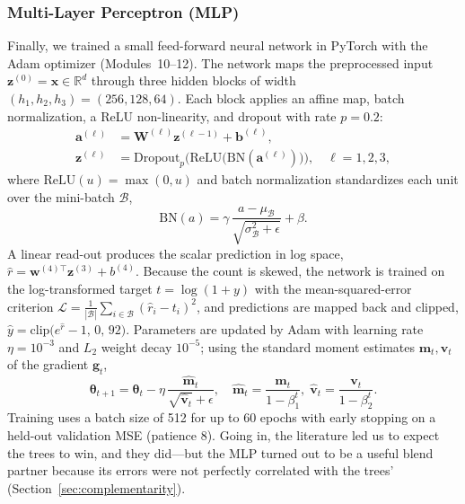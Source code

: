 \documentclass[journal]{IEEEtran}
\begin{document}
\subsubsection{Multi-Layer Perceptron (MLP)}
\label{sec:mlp}
Finally, we trained a small feed-forward neural network in PyTorch
\cite{paszke2019pytorch} with the Adam optimizer \cite{kingma2015adam}
(Modules~10--12). The network maps the preprocessed input
$\mathbf{z}^{(0)}=\mathbf{x}\in\mathbb{R}^{d}$ through three hidden blocks of
width $(h_1,h_2,h_3)=(256,128,64)$. Each block applies an affine map, batch
normalization, a ReLU non-linearity, and dropout with rate $p=0.2$:
\begin{align}
\mathbf{a}^{(\ell)} &= \mathbf{W}^{(\ell)}\mathbf{z}^{(\ell-1)}+\mathbf{b}^{(\ell)},
\label{eq:mlp_aff}\\
\mathbf{z}^{(\ell)} &= \mathrm{Dropout}_{p}\!\Big(\mathrm{ReLU}\big(
\mathrm{BN}(\mathbf{a}^{(\ell)})\big)\Big),\quad \ell=1,2,3,
\label{eq:mlp_block}
\end{align}
where $\mathrm{ReLU}(u)=\max(0,u)$ and batch normalization standardizes each
unit over the mini-batch $\mathcal{B}$,
\begin{equation}
\mathrm{BN}(a)=\gamma\,\frac{a-\mu_{\mathcal{B}}}{\sqrt{\sigma_{\mathcal{B}}^{2}+\epsilon}}+\beta .
\label{eq:bn}
\end{equation}
A linear read-out produces the scalar prediction in log space,
$\hat r=\mathbf{w}^{(4)\top}\mathbf{z}^{(3)}+b^{(4)}$. Because the count is
skewed, the network is trained on the log-transformed target
$t=\log(1+y)$ with the mean-squared-error criterion
$\mathcal{L}=\tfrac{1}{|\mathcal{B}|}\sum_{i\in\mathcal{B}}(\hat r_i-t_i)^2$, and
predictions are mapped back and clipped,
$\hat y=\mathrm{clip}\big(e^{\hat r}-1,\,0,\,92\big)$. Parameters are updated by
Adam with learning rate $\eta=10^{-3}$ and $L_2$ weight decay $10^{-5}$; using
the standard moment estimates $\mathbf{m}_t,\mathbf{v}_t$ of the gradient
$\mathbf{g}_t$,
\begin{equation}
\boldsymbol{\theta}_{t+1}=\boldsymbol{\theta}_{t}
-\eta\,\frac{\hat{\mathbf m}_t}{\sqrt{\hat{\mathbf v}_t}+\epsilon},
\quad
\hat{\mathbf m}_t=\frac{\mathbf m_t}{1-\beta_1^{t}},\;
\hat{\mathbf v}_t=\frac{\mathbf v_t}{1-\beta_2^{t}}.
\label{eq:adam}
\end{equation}
Training uses a batch size of 512 for up to 60 epochs with early stopping on a
held-out validation MSE (patience 8). Going in, the literature
\cite{tang2024,camatti2024} led us to expect the trees to win, and they
did---but the MLP turned out to be a useful blend partner because its errors
were not perfectly correlated with the trees' (Section~\ref{sec:complementarity}).
\end{document}
